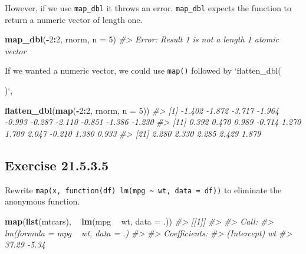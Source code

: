 \documentclass[]{book}
\newenvironment{Shaded}{\begin{snugshade}}{\end{snugshade}}
\newcommand{\CommentTok}[1]{\textcolor[rgb]{0.56,0.35,0.01}{\textit{#1}}}
\newcommand{\DataTypeTok}[1]{\textcolor[rgb]{0.13,0.29,0.53}{#1}}
\newcommand{\DecValTok}[1]{\textcolor[rgb]{0.00,0.00,0.81}{#1}}
\newcommand{\KeywordTok}[1]{\textcolor[rgb]{0.13,0.29,0.53}{\textbf{#1}}}
\newcommand{\NormalTok}[1]{#1}
\newcommand{\OperatorTok}[1]{\textcolor[rgb]{0.81,0.36,0.00}{\textbf{#1}}}
\newcommand{\StringTok}[1]{\textcolor[rgb]{0.31,0.60,0.02}{#1}}
\theoremstyle{plain}
\theoremstyle{remark}
\begin{document}
However, if we use \texttt{map\_dbl} it throws an error.
\texttt{map\_dbl} expects the function to return a numeric vector of
length one.

\begin{Shaded}
\begin{Highlighting}[]
\KeywordTok{map_dbl}\NormalTok{(}\OperatorTok{-}\DecValTok{2}\OperatorTok{:}\DecValTok{2}\NormalTok{, rnorm, }\DataTypeTok{n =} \DecValTok{5}\NormalTok{)}
\CommentTok{#> Error: Result 1 is not a length 1 atomic vector}
\end{Highlighting}
\end{Shaded}

If we wanted a numeric vector, we could use \texttt{map()} followed by
`flatten\_dbl(

)`,

\begin{Shaded}
\begin{Highlighting}[]
\KeywordTok{flatten_dbl}\NormalTok{(}\KeywordTok{map}\NormalTok{(}\OperatorTok{-}\DecValTok{2}\OperatorTok{:}\DecValTok{2}\NormalTok{, rnorm, }\DataTypeTok{n =} \DecValTok{5}\NormalTok{))}
\CommentTok{#>  [1] -1.402 -1.872 -3.717 -1.964 -0.993 -0.287 -2.110 -0.851 -1.386 -1.230}
\CommentTok{#> [11]  0.392  0.470  0.989 -0.714  1.270  1.709  2.047 -0.210  1.380  0.933}
\CommentTok{#> [21]  2.280  2.330  2.285  2.429  1.879}
\end{Highlighting}
\end{Shaded}

\hypertarget{exercise-21.5.3.5}{%
\subsection*{\texorpdfstring{Exercise
{21.5.3.5}}{Exercise 21.5.3.5}}\label{exercise-21.5.3.5}}

Rewrite
\texttt{map(x,\ function(df)\ lm(mpg\ \textasciitilde{}\ wt,\ data\ =\ df))}
to eliminate the anonymous function.

\begin{Shaded}
\begin{Highlighting}[]
\KeywordTok{map}\NormalTok{(}\KeywordTok{list}\NormalTok{(mtcars), }\OperatorTok{~}\StringTok{ }\KeywordTok{lm}\NormalTok{(mpg }\OperatorTok{~}\StringTok{ }\NormalTok{wt, }\DataTypeTok{data =}\NormalTok{ .))}
\CommentTok{#> [[1]]}
\CommentTok{#> }
\CommentTok{#> Call:}
\CommentTok{#> lm(formula = mpg ~ wt, data = .)}
\CommentTok{#> }
\CommentTok{#> Coefficients:}
\CommentTok{#> (Intercept)           wt  }
\CommentTok{#>       37.29        -5.34}
\end{Highlighting}
\end{Shaded}
\end{document}
